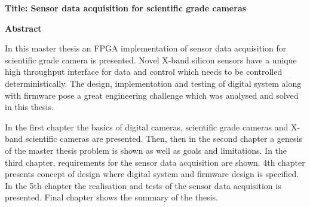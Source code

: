 % 
%



\thispagestyle{empty}
\setcounter{savepage}{\thepage}

\begin{center}


    \large{\textbf{Title: Sensor data acquisition for scientific grade cameras}}

\vspace{0.5cm}

\textbf{Abstract}

\end{center}

In this master thesis an FPGA implementation of sensor data acquisition for scientific grade camera is presented.
Novel X-band silicon sensors have a unique high throughput interface for data and control which needs to be controlled
 deterministically. The design, implementation and testing of digital system along with firmware pose a great
engineering challenge which was analysed and solved in this thesis.   

In the first chapter the basics of digital cameras, scientific grade cameras and X-band scientific cameras are
presented. Then, then in the second chapter a genesis of the master thesis problem is shown as well as goals and
limitations. In the third chapter, requirements for the sensor data acquisition are shown. 4th chapter presents concept
of design where digital system and firmware design is specified. In the 5th chapter the realisation and tests of
the sensor data acquisition is presented. Final chapter shows the summary of the thesis.  


